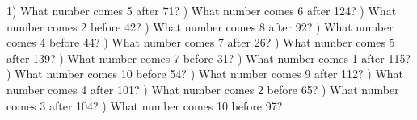 \documentclass{article}%
\begin{document}
1) What number comes 5 after 71?%
\newline%
\newline%
) What number comes 6 after 124?%
\newline%
\newline%
) What number comes 2 before 42?%
\newline%
\newline%
) What number comes 8 after 92?%
\newline%
\newline%
) What number comes 4 before 44?%
\newline%
\newline%
) What number comes 7 after 26?%
\newline%
\newline%
) What number comes 5 after 139?%
\newline%
\newline%
) What number comes 7 before 31?%
\newline%
\newline%
) What number comes 1 after 115?%
\newline%
\newline%
) What number comes 10 before 54?%
\newline%
\newline%
) What number comes 9 after 112?%
\newline%
\newline%
) What number comes 4 after 101?%
\newline%
\newline%
) What number comes 2 before 65?%
\newline%
\newline%
) What number comes 3 after 104?%
\newline%
\newline%
) What number comes 10 before 97?%
\end{document}
